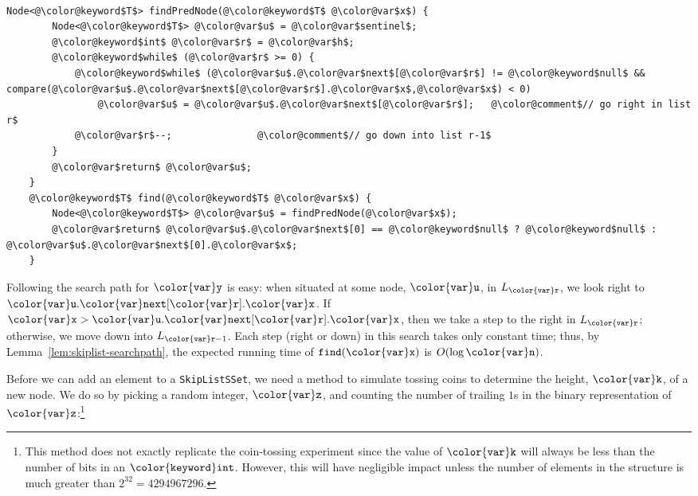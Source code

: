 \documentclass[10pt]{book}
\theoremstyle{plain}
\newcommand{\lemref}[1]{Lemma~\ref{lem:#1}}
\theoremstyle{definition}
\begin{document}
 \ \vspace{.5ex}\begin{Verbatim}[gobble=1,tabsize=2,frame=single,framerule=1.2pt,commandchars=\\@\$,label=\texttt{SkiplistSSet},labelposition=topline]
	Node<@\color@keyword$T$> findPredNode(@\color@keyword$T$ @\color@var$x$) {
		Node<@\color@keyword$T$> @\color@var$u$ = @\color@var$sentinel$;
		@\color@keyword$int$ @\color@var$r$ = @\color@var$h$;
		@\color@keyword$while$ (@\color@var$r$ >= 0) {
			@\color@keyword$while$ (@\color@var$u$.@\color@var$next$[@\color@var$r$] != @\color@keyword$null$ && compare(@\color@var$u$.@\color@var$next$[@\color@var$r$].@\color@var$x$,@\color@var$x$) < 0)
				@\color@var$u$ = @\color@var$u$.@\color@var$next$[@\color@var$r$];   @\color@comment$// go right in list r$
			@\color@var$r$--;               @\color@comment$// go down into list r-1$
		}
		@\color@var$return$ @\color@var$u$;
	}
	@\color@keyword$T$ find(@\color@keyword$T$ @\color@var$x$) {
		Node<@\color@keyword$T$> @\color@var$u$ = findPredNode(@\color@var$x$);
		@\color@var$return$ @\color@var$u$.@\color@var$next$[0] == @\color@keyword$null$ ? @\color@keyword$null$ : @\color@var$u$.@\color@var$next$[0].@\color@var$x$;
	}
\end{Verbatim}


Following the search path for \ensuremath{\mathtt{{\color{var}y}}} is easy:  when situated at
some node, \ensuremath{\mathtt{{\color{var}u}}}, in  $L_{\ensuremath{\mathtt{{\color{var}r}}}}$, we look right to \ensuremath{\mathtt{{\color{var}u}.{\color{var}next}[{\color{var}r}].{\color{var}x}}}.
If $\ensuremath{\mathtt{{\color{var}x}}}>\ensuremath{\mathtt{{\color{var}u}.{\color{var}next}[{\color{var}r}].{\color{var}x}}}$, then we take a step to the right in
$L_{\ensuremath{\mathtt{{\color{var}r}}}}$; otherwise, we move down into $L_{\ensuremath{\mathtt{{\color{var}r}}}-1}$.  Each step
(right or down) in this search takes only constant time; thus, by
\lemref{skiplist-searchpath}, the expected running time of \ensuremath{\mathtt{find({\color{var}x})}}
is $O(\log \ensuremath{\mathtt{{\color{var}n}}})$.

Before we can add an element to a \texttt{SkipListSSet}, we need a method to
simulate tossing coins to determine the height, \ensuremath{\mathtt{{\color{var}k}}}, of a new node.
We do so by picking a random integer, \ensuremath{\mathtt{{\color{var}z}}}, and counting the number of
trailing $1$s in the binary representation of \ensuremath{\mathtt{{\color{var}z}}}:\footnote{This method
does not exactly replicate the coin-tossing experiment since the value of
\ensuremath{\mathtt{{\color{var}k}}} will always be less than the number of bits in an \ensuremath{\mathtt{{\color{keyword}int}}}.  However,
this will have negligible impact unless the number of elements in the
structure is much greater than $2^{32}=4294967296$.}
\end{document}
